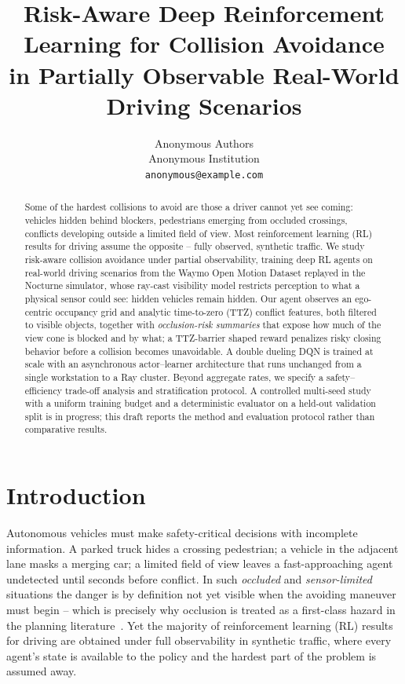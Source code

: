 \documentclass{article}
\title{\textbf{Risk-Aware Deep Reinforcement Learning for Collision Avoidance\\
in Partially Observable Real-World Driving Scenarios}}
\author{%
  Anonymous Authors\\
  Anonymous Institution\\
  \texttt{anonymous@example.com}
}
\date{}
\begin{document}
\maketitle

\begin{abstract}
Some of the hardest collisions to avoid are those a driver cannot yet see
coming: vehicles hidden behind blockers, pedestrians emerging from occluded
crossings, conflicts developing outside a limited field of view. Most
reinforcement learning (RL) results for driving assume the opposite --
fully observed, synthetic traffic. We study risk-aware collision avoidance
under partial observability, training deep RL agents on real-world driving
scenarios from the Waymo Open Motion Dataset replayed in the Nocturne
simulator, whose ray-cast visibility model restricts perception to what a
physical sensor could see: hidden vehicles remain hidden. Our agent
observes an ego-centric occupancy grid and analytic time-to-zero (TTZ)
conflict features, both filtered to visible objects, together with
\emph{occlusion-risk summaries} that expose how much of the view cone is
blocked and by what; a TTZ-barrier shaped reward penalizes risky closing
behavior before a collision becomes unavoidable. A double dueling DQN is
trained at scale with an asynchronous actor--learner architecture that runs
unchanged from a single workstation to a Ray cluster. Beyond aggregate
rates, we specify a safety--efficiency trade-off analysis and stratification
protocol. A controlled multi-seed study with a uniform training budget and a
deterministic evaluator on a held-out validation split is in progress; this
draft reports the method and evaluation protocol rather than comparative
results.
\end{abstract}

\section{Introduction}
\label{sec:introduction}

Autonomous vehicles must make safety-critical decisions with incomplete
information. A parked truck hides a crossing pedestrian; a vehicle in the
adjacent lane masks a merging car; a limited field of view leaves a
fast-approaching agent undetected until seconds before conflict. In such
\emph{occluded} and \emph{sensor-limited} situations the danger is by
definition not yet visible when the avoiding maneuver must begin -- which is
precisely why occlusion is treated as a first-class hazard in the planning
literature~\citep{orzechowski2018tackling, bouton2018scalable}. Yet the
majority of reinforcement learning (RL) results for driving are obtained
under full observability in synthetic traffic, where every agent's state is
available to the policy and the hardest part of the problem is assumed away.
\end{document}
